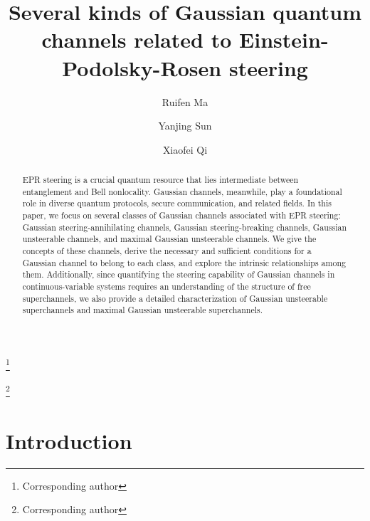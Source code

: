 \documentclass[10pt,aps,pra,amsfonts,amssymb,amsmath,%
floatfix,nofootinbib, groupedaddress,superscriptaddress,citesort,twocolumn
]{revtex4}%
\begin{document}
	
	
	\title{ Several kinds of  Gaussian quantum  channels  related to Einstein-Podolsky-Rosen steering}
	
	
	\author{Ruifen Ma}\thanks{Corresponding author}
	
	
	
	\author{Yanjing Sun}
	


	\author{Xiaofei Qi}\thanks{Corresponding author}


\begin{abstract}
EPR steering is a crucial quantum resource that lies intermediate between entanglement and Bell nonlocality. Gaussian channels, meanwhile, play a foundational role in diverse quantum protocols, secure communication, and related fields. In this paper, we focus on several classes of Gaussian channels associated with EPR steering: Gaussian steering-annihilating channels, Gaussian steering-breaking channels, Gaussian unsteerable channels, and maximal Gaussian unsteerable channels. We give the concepts of these channels, derive the necessary and sufficient conditions for a Gaussian channel to belong to each class, and explore the intrinsic relationships among them. Additionally, since quantifying the steering capability of Gaussian channels in continuous-variable systems requires an understanding of the structure of free superchannels, we also provide a detailed characterization of Gaussian unsteerable superchannels and maximal Gaussian unsteerable superchannels.
\end{abstract}



\maketitle
\section{Introduction}
\end{document}
